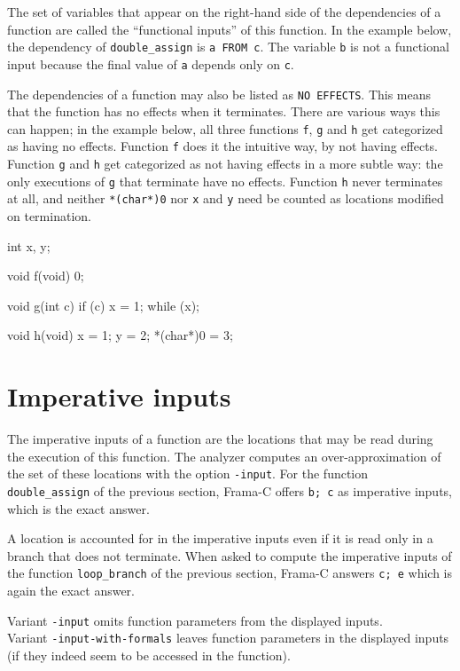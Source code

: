 \documentclass{frama-c-book}
\begin{document}
The set of variables that appear on the right-hand side of the
dependencies of a function are called the ``functional inputs''
of this function. In the example below, the dependency of
\lstinline|double_assign| is \lstinline|a FROM c|.
The variable \lstinline|b| is not a functional input because the final value
of \lstinline|a| depends only on \lstinline|c|.

The dependencies of a function may also be listed as \lstinline|NO EFFECTS|.
This means that the function has no effects when it terminates. There
are various ways this can happen; in the example below, all three functions
\lstinline|f|, \lstinline|g| and \lstinline|h| get categorized as having
no effects. Function \lstinline|f| does it the intuitive way, by not having
effects. Function \lstinline|g| and \lstinline|h| get categorized as
not having effects in a more subtle way: the only executions of \lstinline|g|
that terminate have no effects. Function \lstinline|h| never terminates at all,
and neither \lstinline|*(char*)0| nor \lstinline|x| and \lstinline|y| need
be counted as locations modified on termination.

\begin{listing}{1}
int x, y;

void f(void)
{
  0;
}

void g(int c)
{
  if (c)
  {
    x = 1;
    while (x);
  }
}

void h(void)
{
  x = 1;
  y = 2;
  *(char*)0 = 3;
}
\end{listing}

\section{Imperative inputs}

The imperative inputs of a function are the locations that
may be read during the execution of this function. The analyzer
computes an over-approximation of the set of these locations
with the option \verb|-input|. For the function \lstinline|double_assign|
of the previous section, Frama-C offers \lstinline|b; c|
as imperative inputs, which is the exact answer.

A location is accounted for in the imperative inputs even if
it is read only in a branch that does not terminate.
When asked to compute the imperative inputs of the function
\lstinline|loop_branch| of the previous section, Frama-C answers
\lstinline|c; e| which is again the exact answer.

Variant \verb|-input| omits function parameters from the displayed inputs.\\
Variant \verb|-input-with-formals| leaves function parameters in the displayed inputs (if they indeed seem to be accessed in the function).
\end{document}

